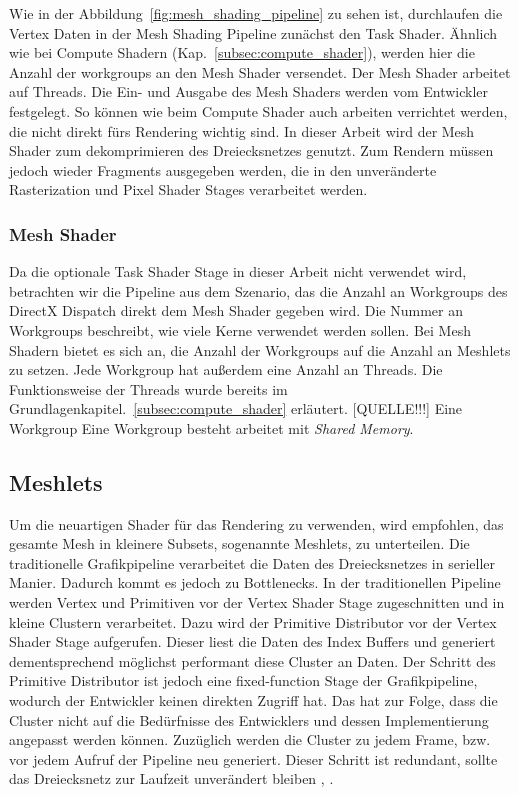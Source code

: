 Wie in der Abbildung~\ref{fig:mesh_shading_pipeline} zu sehen ist, durchlaufen die Vertex Daten in der Mesh Shading Pipeline zunächst den Task Shader.
Ähnlich wie bei Compute Shadern (Kap.~\ref{subsec:compute_shader}), werden hier die Anzahl der workgroups an den Mesh Shader versendet.
Der Mesh Shader arbeitet auf Threads.
Die Ein- und Ausgabe des Mesh Shaders werden vom Entwickler festgelegt.
So können wie beim Compute Shader auch arbeiten verrichtet werden, die nicht direkt fürs Rendering wichtig sind.
In dieser Arbeit wird der Mesh Shader zum dekomprimieren des Dreiecksnetzes genutzt.
Zum Rendern müssen jedoch wieder Fragments ausgegeben werden, die in den unveränderte Rasterization und Pixel Shader Stages verarbeitet werden. \cite{Kubisch2018}

\subsubsection{Mesh Shader}
Da die optionale Task Shader Stage in dieser Arbeit nicht verwendet wird, betrachten wir die Pipeline aus dem Szenario, das die Anzahl an Workgroups des DirectX Dispatch direkt dem Mesh Shader gegeben wird.
Die Nummer an Workgroups beschreibt, wie viele Kerne verwendet werden sollen.
Bei Mesh Shadern bietet es sich an, die Anzahl der Workgroups auf die Anzahl an Meshlets zu setzen.
Jede Workgroup hat außerdem eine Anzahl an Threads.
Die Funktionsweise der Threads wurde bereits im Grundlagenkapitel.~\ref{subsec:compute_shader} erläutert. [QUELLE!!!]
Eine Workgroup 
Eine Workgroup besteht arbeitet mit \textit{Shared Memory}.

\subsection{Meshlets}
\label{subsec:meshlets}
Um die neuartigen Shader für das Rendering zu verwenden, wird empfohlen, das gesamte Mesh in kleinere Subsets, sogenannte Meshlets, zu unterteilen. 
Die traditionelle Grafikpipeline verarbeitet die Daten des Dreiecksnetzes in serieller Manier. 
Dadurch kommt es jedoch zu Bottlenecks.
In der traditionellen Pipeline werden Vertex und Primitiven vor der Vertex Shader Stage zugeschnitten und in kleine Clustern verarbeitet.
Dazu wird der Primitive Distributor vor der Vertex Shader Stage aufgerufen.
Dieser liest die Daten des Index Buffers und generiert dementsprechend möglichst performant diese Cluster an Daten.
Der Schritt des Primitive Distributor ist jedoch eine fixed-function Stage der Grafikpipeline, wodurch der Entwickler keinen direkten Zugriff hat.
Das hat zur Folge, dass die Cluster nicht auf die Bedürfnisse des Entwicklers und dessen Implementierung angepasst werden können.
Zuzüglich werden die Cluster zu jedem Frame, bzw. vor jedem Aufruf der Pipeline neu generiert.
Dieser Schritt ist redundant, sollte das Dreiecksnetz zur Laufzeit unverändert bleiben \cite{Carvalho2022}, \cite{Kubisch2018}. \newline

